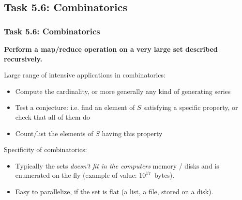 \documentclass{beamer}
\begin{document}
\subsection{Task 5.6: Combinatorics}
\begin{frame}[fragile]
  \frametitle{Task 5.6: Combinatorics}

  \begin{center}
    {%
      \begin{minipage}{9cm}\Large\bf
        Perform a {\color{red}map/reduce} operation on a very large set
        described {\color{blue}recursively}.
      \end{minipage}
    }
  \end{center}
  \begin{block}{Large range of intensive applications in combinatorics:}
  \begin{itemize}
  \item Compute the cardinality, or more generally any kind of generating series
  \item Test a conjecture: i.e. find an element of $S$ satisfying a specific
    property, or check that all of them do
  \item Count/list the elements of $S$ having this property
  \end{itemize}
\end{block}

  \begin{block}{Specificity of combinatorics:}
  \begin{itemize}
  \item Typically the sets \emph{doesn't fit in the computers} memory / disks
    and is enumerated on the fly (example of value: $10^{17}$~bytes).
  \item Easy to parallelize, if the set is flat (a list, a file, stored on a disk).
    \bigskip
  \end{itemize}
\end{block}
\end{frame}
\end{document}
